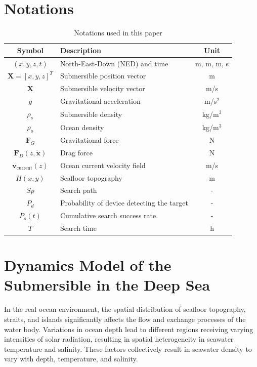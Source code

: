 \documentclass{mcmthesis}
\begin{document}
\section{Notations}
\vspace{-0.3cm}
\begin{table}[H]
\centering
\caption{Notations used in this paper}
\vspace{-0.4cm}
\begin{tabularx}{0.8\textwidth}{cXc}
\toprule
Symbol & Description & Unit \\
\midrule
$(x,y,z,t)$ & North-East-Down (NED)  and time & m, m, m, s \\
$\bm{X}=[x,y,z]^T$ & Submersible position vector & m \\
$\dot{\bm{X}}$ & Submersible velocity vector & m/s \\
$g$ & Gravitational acceleration & m/s$^2$ \\
$\rho_s$ & Submersible density & kg/m$^3$ \\
$\rho_o$ & Ocean density & kg/m$^3$ \\
$\bm{F}_G$ & Gravitational force & N \\
$\bm{F}_D(z,\dot{\bm{x}})$ & Drag force & N \\
$\bm{v}_{\mathrm{current}}(z)$ & Ocean current velocity field & m/s \\
$H(x, y)$ & Seafloor topography & m \\
$Sp$ & Search path & - \\
$P_d$ & Probability of device detecting the target & - \\
$P_s(t)$ & Cumulative search success rate & - \\
$T$ & Search time & h \\
\bottomrule
\end{tabularx}
\end{table}
\section{Dynamics Model of the Submersible in the Deep Sea}
In the real ocean environment, the spatial distribution of seafloor topography, straits, and islands significantly affects the flow and exchange processes of the water body.
Variations in ocean depth lead to different regions receiving varying intensities of solar radiation,
resulting in spatial heterogeneity in seawater temperature and salinity.
These factors collectively result in seawater density to vary with depth, temperature, and salinity.
\end{document}
